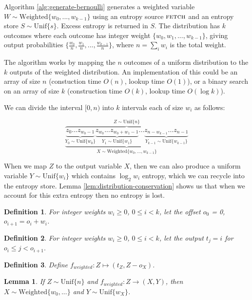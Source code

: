 \documentclass[12pt]{article}
\newtheorem{lemma}{Lemma}
\newtheorem{definition}{Definition}
\newcommand{\unif}[1]{\mathrm{Unif}\{#1\}}
\begin{document}
Algorithm \ref{alg:generate-bernoulli} generates a weighted variable $W \sim \mathrm{Weighted}\{w_0, ..., w_{k-1}\}$ using an entropy source $\textsc{fetch}$ and an entropy store $S \sim \unif{s}$. Excess entropy is returned in $S$. The distribution has $k$ outcomes where each outcome has integer weight $\{w_0, w_1, ..., w_{k-1}\}$, giving output probabilities $\{\frac{w_0}{n}, \frac{w_1}{n}, ..., \frac{w_{k-1}}{n}\}$, where $n=\sum_i w_i$ is the total weight.

The algorithm works by mapping the $n$ outcomes of a uniform distribution to the $k$ outputs of the weighted distribution. An implementation of this could be an array of size $n$ (constuction time $O(n)$, lookup time $O(1)$), or a binary search on an array of size $k$ (construction time $O(k)$, lookup time $O(\log k)$).

We can divide the interval $[0,n)$ into $k$ intervals each of size $w_i$ as follows:

\[
\overbrace{
    \underbrace{
        \underbrace{z_0 ... z_{w_0-1}}_{Y_0 \sim \unif{w_0}}
          \underbrace{z_{w_0} ... z_{w_0+w_1-1}}_{Y_1 \sim \unif{w_1}}
          ...
          \underbrace{
             z_{n-w_{k-1}} ... 
             z_{n-1}
         }_{Y_{k-1} \sim \unif{w_{k-1}}}
    }_{X \sim \mathrm{Weighted}\{w_0, ..., w_{k-1}\}}
}^{Z \sim \unif{n}}
\]

When we map $Z$ to the output variable $X$, then we can also produce a uniform variable $Y \sim \unif{w_i}$ which contains $\log_2w_i$ entropy, which we can recycle into the entropy store. Lemma \ref{lem:distribution-conservation} shows us that when we account for this extra entropy then no entropy is lost.

\begin{definition}
    \label{def:o}
    For integer weights $w_i \ge 0$, $0 \le i < k$, let the offset $o_0$ = 0, $o_{i+1} = o_i + w_i$.
\end{definition}

\begin{definition}
    \label{def:t}
    For integer weights $w_i \ge 0$, $0 \le i < k$, let the output $t_j = i$ for $o_i \le j < o_{i+1}.$
\end{definition}

\begin{definition}
    Define $f_{weighted}: Z \mapsto (t_Z, Z-o_X)$.
\end{definition}

\begin{lemma}
    If $Z \sim \unif{n}$ and $f_{weighted}: Z \rightarrow (X, Y)$, then $X \sim \mathrm{Weighted}\{w_0, ...\}$ and $Y \sim \unif{w_X}$.
\end{lemma}
\end{document}
